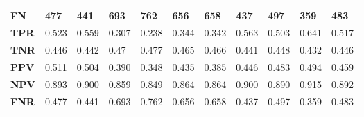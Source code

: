 \documentclass[a4paper]{article}
\begin{document}
\begin{table}[H]
\begin{tabular}{l|l|l|l|l|l|l|l|l|l|l|}
        \multicolumn{1}{|l|}{\textbf{FN}}  & 477                           & 441                           & 693                           & 762                           & 656                           & 658                           & 437                           & 497                           & 359                           & 483                           \\ \hline
        \multicolumn{1}{|l|}{\textbf{TPR}} & \cellcolor[HTML]{FFCCC9}0.523 & \cellcolor[HTML]{FFCCC9}0.559 & \cellcolor[HTML]{FD6864}0.307 & \cellcolor[HTML]{FD6864}0.238 & \cellcolor[HTML]{FD6864}0.344 & \cellcolor[HTML]{FD6864}0.342 & \cellcolor[HTML]{FFCCC9}0.563 & \cellcolor[HTML]{FFCCC9}0.503 & \cellcolor[HTML]{FFCCC9}0.641 & \cellcolor[HTML]{FFCCC9}0.517 \\ \hline
        \multicolumn{1}{|l|}{\textbf{TNR}} & \cellcolor[HTML]{FFFFFF}0.446 & \cellcolor[HTML]{FFFFFF}0.442 & \cellcolor[HTML]{FFFFFF}0.47  & \cellcolor[HTML]{FFFFFF}0.477 & \cellcolor[HTML]{FFFFFF}0.465 & \cellcolor[HTML]{FFFFFF}0.466 & \cellcolor[HTML]{FFFFFF}0.441 & \cellcolor[HTML]{FFFFFF}0.448 & \cellcolor[HTML]{FFFFFF}0.432 & \cellcolor[HTML]{FFFFFF}0.446 \\ \hline
        \multicolumn{1}{|l|}{\textbf{PPV}} & \cellcolor[HTML]{FFFFFF}0.511 & \cellcolor[HTML]{FFFFFF}0.504 & \cellcolor[HTML]{FFFFFF}0.390 & \cellcolor[HTML]{FFFFFF}0.348 & \cellcolor[HTML]{FFFFFF}0.435 & \cellcolor[HTML]{FFFFFF}0.385 & \cellcolor[HTML]{FFFFFF}0.446 & \cellcolor[HTML]{FFFFFF}0.483 & \cellcolor[HTML]{FFFFFF}0.494 & \cellcolor[HTML]{FFFFFF}0.459 \\ \hline
        \multicolumn{1}{|l|}{\textbf{NPV}} & \cellcolor[HTML]{FFFFFF}0.893 & \cellcolor[HTML]{FFFFFF}0.900 & \cellcolor[HTML]{FFFFFF}0.859 & \cellcolor[HTML]{FFFFFF}0.849 & \cellcolor[HTML]{FFFFFF}0.864 & \cellcolor[HTML]{FFFFFF}0.864 & \cellcolor[HTML]{FFFFFF}0.900 & \cellcolor[HTML]{FFFFFF}0.890 & \cellcolor[HTML]{FFFFFF}0.915 & \cellcolor[HTML]{FFFFFF}0.892 \\ \hline
        \multicolumn{1}{|l|}{\textbf{FNR}} & \cellcolor[HTML]{FFCCC9}0.477 & \cellcolor[HTML]{FFCCC9}0.441 & \cellcolor[HTML]{FD6864}0.693 & \cellcolor[HTML]{FD6864}0.762 & \cellcolor[HTML]{FD6864}0.656 & \cellcolor[HTML]{FD6864}0.658 & \cellcolor[HTML]{FFCCC9}0.437 & \cellcolor[HTML]{FFCCC9}0.497 & \cellcolor[HTML]{FFCCC9}0.359 & \cellcolor[HTML]{FFCCC9}0.483 \\ \hline
    \end{tabular}
\end{table}
\end{document}
